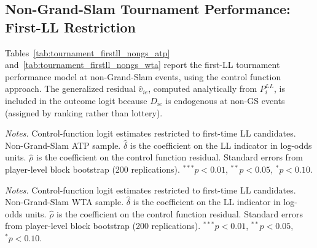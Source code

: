 \subsection{Non-Grand-Slam Tournament Performance: First-LL Restriction}
\label{app:nongs_tournament_firstll}

Tables~\ref{tab:tournament_firstll_nongs_atp} and~\ref{tab:tournament_firstll_nongs_wta} report the first-LL tournament performance model at non-Grand-Slam events, using the control function approach. The generalized residual $\hat{v}_{ie}$, computed analytically from $P_i^{LL}$, is included in the outcome logit because $D_{ie}$ is endogenous at non-GS events (assigned by ranking rather than lottery).

\begin{table}[htbp]
\centering
\caption{Non-Grand-Slam Tournament Performance: ATP (First-LL, Control Function)}
\label{tab:tournament_firstll_nongs_atp}
\begin{threeparttable}
\small

\begin{tablenotes}
\footnotesize
\item \textit{Notes.} Control-function logit estimates restricted to first-time LL candidates. Non-Grand-Slam ATP sample. $\hat{\delta}$ is the coefficient on the LL indicator in log-odds units. $\hat{\rho}$ is the coefficient on the control function residual. Standard errors from player-level block bootstrap (200 replications). $^{***}p<0.01$, $^{**}p<0.05$, $^{*}p<0.10$.
\end{tablenotes}
\end{threeparttable}
\end{table}

\begin{table}[htbp]
\centering
\caption{Non-Grand-Slam Tournament Performance: WTA (First-LL, Control Function)}
\label{tab:tournament_firstll_nongs_wta}
\begin{threeparttable}
\small

\begin{tablenotes}
\footnotesize
\item \textit{Notes.} Control-function logit estimates restricted to first-time LL candidates. Non-Grand-Slam WTA sample. $\hat{\delta}$ is the coefficient on the LL indicator in log-odds units. $\hat{\rho}$ is the coefficient on the control function residual. Standard errors from player-level block bootstrap (200 replications). $^{***}p<0.01$, $^{**}p<0.05$, $^{*}p<0.10$.
\end{tablenotes}
\end{threeparttable}
\end{table}

